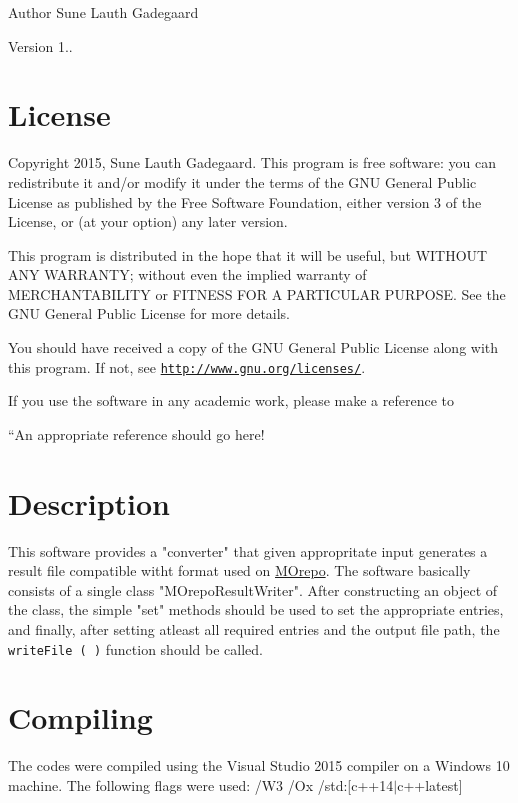 \begin{DoxyAuthor}{Author}
Sune Lauth Gadegaard 
\end{DoxyAuthor}
\begin{DoxyVersion}{Version}
1..
\end{DoxyVersion}
\hypertarget{index_License}{}\section{License}\label{index_License}
Copyright 2015, Sune Lauth Gadegaard. This program is free software\+: you can redistribute it and/or modify it under the terms of the G\+NU General Public License as published by the Free Software Foundation, either version 3 of the License, or (at your option) any later version.

This program is distributed in the hope that it will be useful, but W\+I\+T\+H\+O\+UT A\+NY W\+A\+R\+R\+A\+N\+TY; without even the implied warranty of M\+E\+R\+C\+H\+A\+N\+T\+A\+B\+I\+L\+I\+TY or F\+I\+T\+N\+E\+SS F\+OR A P\+A\+R\+T\+I\+C\+U\+L\+AR P\+U\+R\+P\+O\+SE. See the G\+NU General Public License for more details.

You should have received a copy of the G\+NU General Public License along with this program. If not, see \href{http://www.gnu.org/licenses/}{\tt http\+://www.\+gnu.\+org/licenses/}.

If you use the software in any academic work, please make a reference to

``\+An appropriate reference should go here!\textquotesingle{}\textquotesingle{}  
 \section{Description}

 This software provides a "converter" that given appropritate input generates a result file compatible witht format used on \href{https://github.com/MCDMSociety}{MOrepo}.
 The software basically consists of a single class "MOrepoResultWriter". After constructing an object of the class, the simple "set" methods should be used to set the appropriate
 entries, and finally, after setting atleast all required entries and the output file path, the \texttt{writeFile ( )} function should be called.
 \hypertarget{index_Compiling}{}\section{Compiling}\label{index_Compiling}
The codes were compiled using the Visual Studio 2015 compiler on a Windows 10 machine. The following flags were used\+: /\+W3 /\+Ox /std\+:\mbox{[}c++14$\vert$c++latest\mbox{]}

